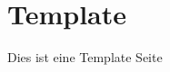 \documentclass[main.tex]{subfiles}
\begin{document}
\section{Template}

Dies ist eine Template Seite

\blinddocument
\end{document}
